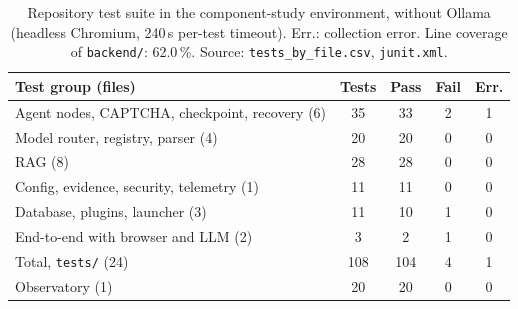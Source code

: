 \begin{table}[t]
\centering
\caption{Repository test suite in the component-study environment, without Ollama (headless Chromium, 240\,s per-test timeout). Err.: collection error. Line coverage of \texttt{backend/}: 62.0\,\%. Source: \texttt{tests\_by\_file.csv}, \texttt{junit.xml}.}
\label{tab:tests}
\footnotesize
\setlength{\tabcolsep}{3pt}
\begin{tabular}{@{}lcccc@{}}
\toprule
Test group (files) & Tests & Pass & Fail & Err. \\
\midrule
Agent nodes, CAPTCHA, checkpoint, recovery (6) & 35 & 33 & 2 & 1 \\
Model router, registry, parser (4) & 20 & 20 & 0 & 0 \\
RAG (8) & 28 & 28 & 0 & 0 \\
Config, evidence, security, telemetry (1) & 11 & 11 & 0 & 0 \\
Database, plugins, launcher (3) & 11 & 10 & 1 & 0 \\
End-to-end with browser and LLM (2) & 3 & 2 & 1 & 0 \\
\midrule
Total, \texttt{tests/} (24) & 108 & 104 & 4 & 1 \\
Observatory (1) & 20 & 20 & 0 & 0 \\
\bottomrule
\end{tabular}
\end{table}
